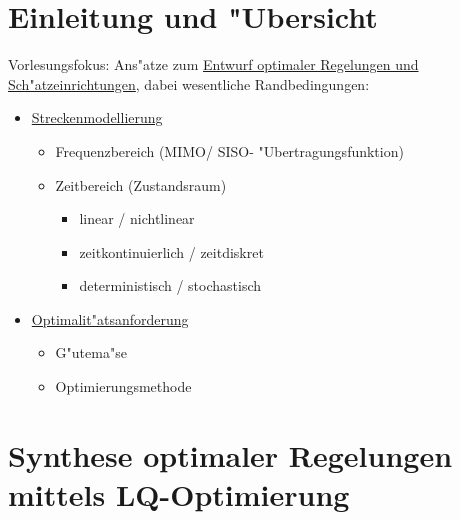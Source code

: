 \documentclass[openany,a4paper,11pt]{book}
\begin{document}
\setcounter{chapter}{-1}
\chapter[Einleitung und "Ubersicht]{Einleitung und "Ubersicht}
Vorlesungsfokus: Ans"atze zum \uline{Entwurf optimaler Regelungen und Sch"atzeinrichtungen}, dabei wesentliche Randbedingungen:
\begin{itemize}
\item \uline{Streckenmodellierung} \begin{itemize}
\item Frequenzbereich (MIMO/ SISO- "Ubertragungsfunktion)
\item Zeitbereich (Zustandsraum) \begin{itemize}
\item linear / nichtlinear
\item zeitkontinuierlich / zeitdiskret
\item deterministisch / stochastisch
\end{itemize}
\end{itemize}
\item \uline{Optimalit"atsanforderung} \begin{itemize}
\item G"utema"se
\item Optimierungsmethode
\end{itemize}
\end{itemize}
\clearpage
\chapter{Synthese optimaler Regelungen mittels LQ-Optimierung}
\end{document}
